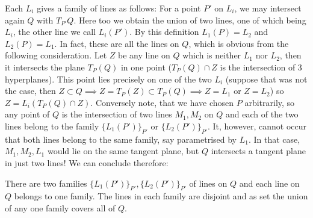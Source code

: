 Each $L_i$ gives a family of lines as follows: For a point $P'$ on $L_i$, we may intersect again $Q$ with $T_{P'}Q$. Here too we obtain the union of two lines, one of which being $L_i$, the other line we call $L_i(P')$.
By this definition $L_1(P) = L_2$ and $L_2(P) = L_1$.
In fact, these are all the lines on $Q$, which is obvious from the following consideration.
Let $Z$ be any line on $Q$ which is neither $L_1$ nor $L_2$, then it intersects the plane $T_P(Q)$ in one point ($T_P(Q) \cap Z$ is the intersection of 3 hyperplanes).
This point lies precisely on one of the two $L_i$ (suppose that was not the case, then $Z \subset Q \implies Z = T_P(Z) \subset T_P(Q) \implies Z=L_1 \text{ or } Z=L_2$) so $Z = L_i(T_P(Q)\cap Z)$.
Conversely note, that we have chosen $P$ arbitrarily, so any point of $Q$ is the intersection of two lines $M_1,M_2$ on $Q$ and each of the two lines belong to the family $\{L_1(P')\}_{P'}$ or $\{L_2(P')\}_{P'}$.
It, however, cannot occur that both lines belong to the same family, say parametrised by $L_1$. In that case, $M_1,M_2,L_1$ would lie on the same tangent plane, but $Q$ intersects a tangent plane in just two lines!
We can conclude therefore:
\begin{proposition}
There are two families $\{ L_1(P') \}_{P'},\{ L_2(P') \}_{P'}$ of lines on $Q$ and each line on $Q$ belongs to one family. The lines in each family are disjoint and as set the union of any one family covers all of $Q$.
\end{proposition}
